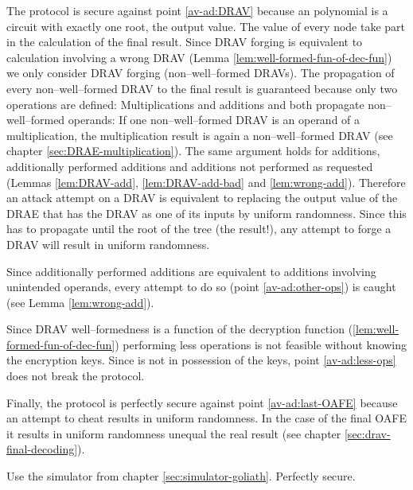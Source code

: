 The protocol is secure against point \ref{av-ad:DRAV} because an polynomial is a
circuit with exactly one root, the output value. The value of every node take
part in the calculation of the final result. Since DRAV forging is equivalent to
calculation involving a wrong DRAV (Lemma \ref{lem:well-formed-fun-of-dec-fun})
we only consider DRAV forging (non--well--formed DRAVs). The propagation of
every non--well--formed DRAV to the final result is guaranteed because only two
operations are defined: Multiplications and additions and both propagate
non--well--formed operands: If one non--well--formed DRAV is an operand of a
multiplication, the multiplication result is again a non--well--formed DRAV (see
chapter \ref{sec:DRAE-multiplication}). The same argument holds for additions,
additionally performed additions and additions not performed as requested
(Lemmas \ref{lem:DRAV-add}, \ref{lem:DRAV-add-bad} and \ref{lem:wrong-add}).
Therefore an attack attempt on a DRAV is equivalent to replacing the output
value of the DRAE that has the DRAV as one of its inputs by uniform randomness.
Since this has to propagate until the root of the tree (the result!), any
attempt to forge a DRAV will result in uniform randomness.

Since additionally performed additions are equivalent to additions involving
unintended operands, every attempt to do so (point \ref{av-ad:other-ops}) is
caught (see Lemma \ref{lem:wrong-add}).

Since DRAV well--formedness is a function of the decryption function
(\ref{lem:well-formed-fun-of-dec-fun}) performing less operations is not
feasible without knowing the encryption keys. Since \JWpTwo{} is not in
possession of the keys, point \ref{av-ad:less-ops} does not break the protocol.

Finally, the protocol is perfectly secure against point \ref{av-ad:last-OAFE}
because an attempt to cheat results in uniform randomness. In the case of
the final OAFE it results in uniform randomness unequal the real result (see
chapter \ref{sec:drav-final-decoding}).



Use the simulator from chapter \ref{sec:simulator-goliath}. Perfectly secure.

